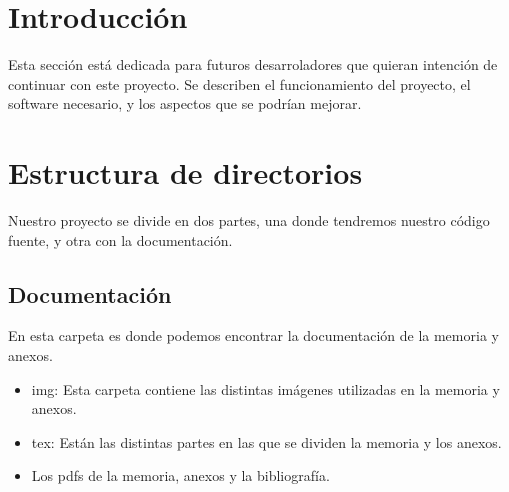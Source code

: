 
\section{Introducción}
Esta sección está dedicada para futuros desarroladores que quieran intención de continuar con este proyecto. Se describen el funcionamiento del proyecto, el software necesario, y los aspectos que se podrían mejorar.

\section{Estructura de directorios}
Nuestro proyecto se divide en dos partes, una donde tendremos nuestro código fuente, y otra con la documentación.

\subsection{Documentación}
En esta carpeta es donde podemos encontrar la documentación de la memoria y anexos.
\begin{itemize}
	\item img: Esta carpeta contiene las distintas imágenes utilizadas en la memoria y anexos.
	\item tex: Están las distintas partes en las que se dividen la memoria y los anexos.
	\item Los pdfs de la memoria, anexos y la bibliografía.
\end{itemize}

